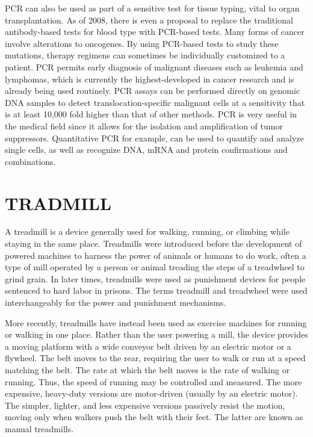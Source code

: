 \documentclass[12pt]{article}
\begin{document}
                PCR can also be used as part of a sensitive test for tissue typing, vital to organ transplantation. As of 2008, there is even a proposal to replace the traditional antibody-based tests for blood type with PCR-based tests.
Many forms of cancer involve alterations to oncogenes. By using PCR-based tests to study these mutations, therapy regimens can sometimes be individually customized to a patient. PCR permits early diagnosis of malignant diseases such as leukemia and lymphomas, which is currently the highest-developed in cancer research and is already being used routinely. PCR assays can be performed directly on genomic DNA samples to detect translocation-specific malignant cells at a sensitivity that is at least 10,000 fold higher than that of other methods. PCR is very useful in the medical field since it allows for the isolation and amplification of tumor suppressors. Quantitative PCR for example, can be used to quantify and analyze single cells, as well as recognize DNA, mRNA and protein confirmations and combinations.
\clearpage





\section{TRADMILL}

A treadmill is a device generally used for walking, running, or climbing while staying in the same place. Treadmills were introduced before the development of powered machines to harness the power of animals or humans to do work, often a type of mill operated by a person or animal treading the steps of a treadwheel to grind grain. In later times, treadmills were used as punishment devices for people sentenced to hard labor in prisons. The terms treadmill and treadwheel were used interchangeably for the power and punishment mechanisms.

More recently, treadmills have instead been used as exercise machines for running or walking in one place. Rather than the user powering a mill, the device provides a moving platform with a wide conveyor belt driven by an electric motor or a flywheel. The belt moves to the rear, requiring the user to walk or run at a speed matching the belt. The rate at which the belt moves is the rate of walking or running. Thus, the speed of running may be controlled and measured. The more expensive, heavy-duty versions are motor-driven (usually by an electric motor). The simpler, lighter, and less expensive versions passively resist the motion, moving only when walkers push the belt with their feet. The latter are known as manual treadmills.
\end{document}
